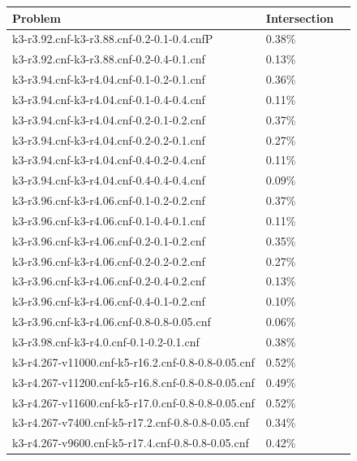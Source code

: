 \documentclass[12pt,a4paper,twoside]{scrartcl}
\numberwithin{equation}{section}
\begin{document}
\begin{table}[H]
\label{tab:combine small} 
\begin{center}
    \begin{tabular}{|l|l|p{1cm}|}
\hline 
Problem &Intersection \\ \hline
k3-r3.92.cnf-k3-r3.88.cnf-0.2-0.1-0.4.cnfP&	0.38\%	\\   \hline
 k3-r3.92.cnf-k3-r3.88.cnf-0.2-0.4-0.1.cnf&	0.13\%	\\   \hline
 k3-r3.94.cnf-k3-r4.04.cnf-0.1-0.2-0.1.cnf&	0.36\%	\\   \hline
 k3-r3.94.cnf-k3-r4.04.cnf-0.1-0.4-0.4.cnf&	0.11\%	\\   \hline
 k3-r3.94.cnf-k3-r4.04.cnf-0.2-0.1-0.2.cnf&	0.37\%	\\   \hline
 k3-r3.94.cnf-k3-r4.04.cnf-0.2-0.2-0.1.cnf&	0.27\%	\\   \hline
 k3-r3.94.cnf-k3-r4.04.cnf-0.4-0.2-0.4.cnf&	0.11\%	\\   \hline
 k3-r3.94.cnf-k3-r4.04.cnf-0.4-0.4-0.4.cnf&	0.09\%	\\   \hline
 k3-r3.96.cnf-k3-r4.06.cnf-0.1-0.2-0.2.cnf&	0.37\%	\\   \hline
 k3-r3.96.cnf-k3-r4.06.cnf-0.1-0.4-0.1.cnf&	0.11\%	\\   \hline
 k3-r3.96.cnf-k3-r4.06.cnf-0.2-0.1-0.2.cnf&	0.35\%	\\   \hline
 k3-r3.96.cnf-k3-r4.06.cnf-0.2-0.2-0.2.cnf&	0.27\%	\\   \hline
 k3-r3.96.cnf-k3-r4.06.cnf-0.2-0.4-0.2.cnf&	0.13\%	\\   \hline
 k3-r3.96.cnf-k3-r4.06.cnf-0.4-0.1-0.2.cnf&	0.10\%	\\   \hline
 k3-r3.96.cnf-k3-r4.06.cnf-0.8-0.8-0.05.cnf&	0.06\%	\\   \hline
 k3-r3.98.cnf-k3-r4.0.cnf-0.1-0.2-0.1.cnf&	0.38\%	\\   \hline
 k3-r4.267-v11000.cnf-k5-r16.2.cnf-0.8-0.8-0.05.cnf&	0.52\%	\\   \hline
 k3-r4.267-v11200.cnf-k5-r16.8.cnf-0.8-0.8-0.05.cnf&	0.49\%	\\   \hline
 k3-r4.267-v11600.cnf-k5-r17.0.cnf-0.8-0.8-0.05.cnf&	0.52\%	\\   \hline
 k3-r4.267-v7400.cnf-k5-r17.2.cnf-0.8-0.8-0.05.cnf&	0.34\%	\\   \hline
 k3-r4.267-v9600.cnf-k5-r17.4.cnf-0.8-0.8-0.05.cnf&	0.42\%	\\   \hline

\end{tabular}
\end{center}
\end{table}
\end{document}
